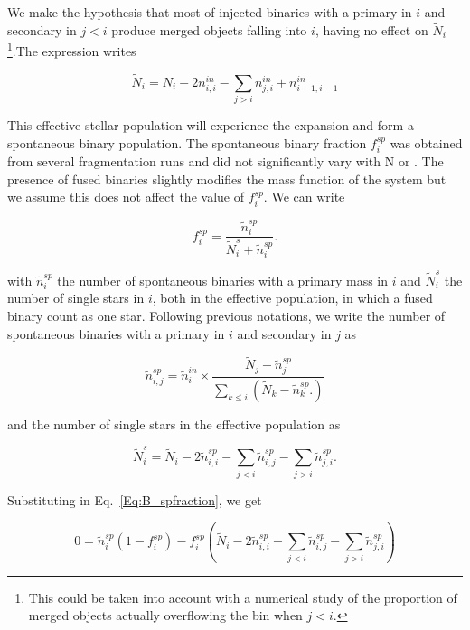 We make the hypothesis that most of injected binaries with a primary in $i$ and secondary in $j<i$ produce merged objects falling into $i$, having no effect on $\tilde{N}_i$ \footnote{This could be taken into account with a numerical study of the proportion of merged objects actually overflowing the bin when $j<i$.}.The expression writes

\begin{equation}
\tilde{N}_i = N_i - 2  n_{i,i}^{in} - \sum\limits_{j>i} n_{j,i}^{in} + n_{i-1,i-1}^{in}
\end{equation}


This effective stellar population will experience the \HubLem expansion and form a spontaneous binary population. The spontaneous binary fraction $f_i^{sp}$ was obtained from several \HubLem fragmentation runs and did not significantly vary with N or \tHub. The presence of fused binaries slightly modifies the mass function of the system but we assume this does not affect the value of $f_i^{sp}$. We can write

\begin{equation}
\label{Eq:B_spfraction}
f_i^{sp} = \frac{\tilde{n}_i^{sp}}{\tilde{N}_i^{s} + \tilde{n}_i^{sp}}.
\end{equation}

with $\tilde{n}_i^{sp}$ the number of spontaneous binaries with a primary mass in $i$ and $\tilde{N}_i^{s}$ the number of single stars in $i$, both in the effective population, in which a fused binary count as one star. Following previous notations, we write the number of spontaneous binaries with a primary in $i$ and secondary in $j$ as

\begin{equation}
\tilde{n}_{i,j}^{sp} = \tilde{n}_i^{in} \times \frac{\tilde{N}_j - \tilde{n}_j^{sp} }{\sum\limits_{k\le i} \left( \tilde{N}_k - \tilde{n}_k^{sp}. \right) }
\end{equation}

and the number of single stars in the effective population as

\begin{equation}
\tilde{N}_i^{s} = \tilde{N}_i - 2  \tilde{n}_{i,i}^{sp} - \sum\limits_{j<i} \tilde{n}_{i,j}^{sp} - \sum\limits_{j>i} \tilde{n}_{j,i}^{sp}.
\end{equation}


Substituting in Eq.~\ref{Eq:B_spfraction}, we get


\begin{equation}
\label{Eq:B_spontaneous}
0 =  \tilde{n}_i^{sp} \left( 1 - f_i^{sp}\right) - f_i^{sp}\left( \tilde{N}_i - 2  \tilde{n}_{i,i}^{sp} - \sum\limits_{j<i} \tilde{n}_{i,j}^{sp} - \sum\limits_{j>i} \tilde{n}_{j,i}^{sp} \right)
\end{equation}

